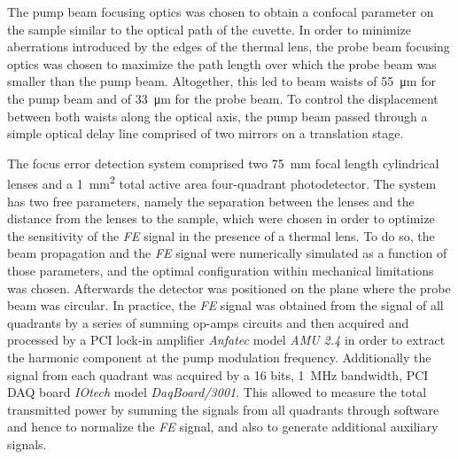 \documentclass[9pt,twocolumn,twoside]{osajnl}
\newcommand{\FE}{\textit{FE}}
\begin{document}
The pump beam focusing optics was chosen to obtain a confocal parameter on the sample similar to the optical path of the cuvette. In order to minimize aberrations introduced by the edges of the thermal lens, the probe beam focusing optics was chosen to maximize the path length over which the probe beam was smaller than the pump beam. Altogether, this led to beam waists of \SI{55}{\micro\metre} for the pump beam and of \SI{33}{\micro\metre} for the probe beam. To control the displacement between both waists along the optical axis, the pump beam passed through a simple optical delay line comprised of two mirrors on a translation stage.

The focus error detection system comprised two \SI{75}{\milli\metre} focal length cylindrical lenses and a \SI{1}{\milli\metre^2} total active area four-quadrant photodetector. The system has two free parameters, namely the separation between the lenses and the distance from the lenses to the sample, which were chosen in order to optimize the sensitivity of the \FE{} signal in the presence of a thermal lens. To do so, the beam propagation and the \FE{} signal were numerically simulated as a function of those parameters, and the optimal configuration within mechanical limitations was chosen. Afterwards the detector was positioned on the plane where the probe beam was circular. In practice, the \FE{} signal was obtained from the signal of all quadrants by a series of summing op-amps circuits and then acquired and processed by a PCI lock-in amplifier \emph{Anfatec} model \emph{AMU 2.4} in order to extract the harmonic component at the pump modulation frequency. Additionally the signal from each quadrant was acquired by a 16 bits, \SI{1}{\mega\hertz} bandwidth, PCI DAQ board \emph{IOtech} model \emph{DaqBoard/3001}. This allowed to measure the total transmitted power by summing the signals from all quadrants through software and hence to normalize the \FE{} signal, and also to generate additional auxiliary signals. \\
\end{document}
